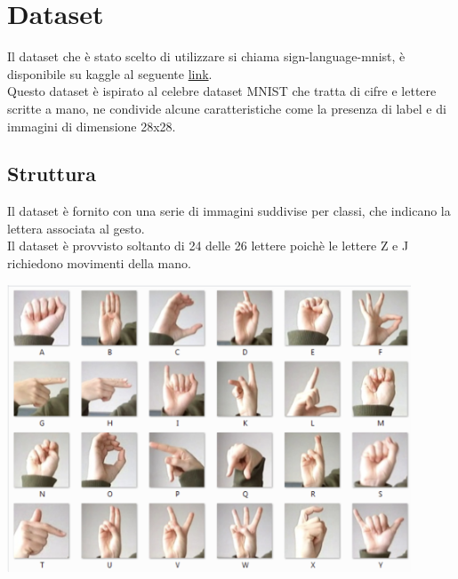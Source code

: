 \documentclass{article}
\begin{document}
\newpage

\section{Dataset}
Il dataset che è stato scelto di utilizzare si chiama sign-language-mnist, è disponibile su kaggle al seguente \href{https://www.kaggle.com/datasets/datamunge/sign-language-mnist}{link}.\\
Questo dataset è ispirato al celebre dataset MNIST che tratta di cifre e lettere scritte a mano, ne condivide alcune caratteristiche come la presenza di label e di immagini di dimensione 28x28.
\subsection{Struttura}
Il dataset è fornito con una serie di immagini suddivise per classi, che indicano la lettera associata al gesto.\\
Il dataset è provvisto soltanto di 24 delle 26 lettere poichè le lettere Z e J richiedono movimenti della mano.
\begin{center}
    \includegraphics[width=0.9\textwidth]{immagini.png}
\end{center}
\end{document}

